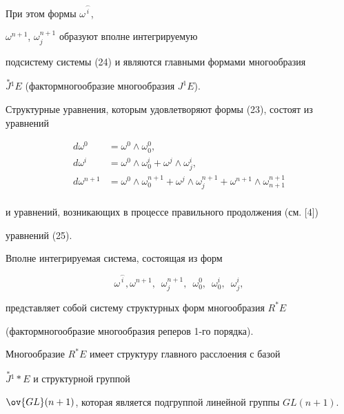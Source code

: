 При этом формы $\omega^{\overset{\frown}{i}{}}$,


$\omega^{n+1}$, $\omega_j^{n+1}$ образуют вполне интегрируемую 


подсистему системы (24) и являются главными формами многообразия


$\overset{*}{J}{}^1 E$ (фактормногообразие многообразия $J^1 E$).


Структурные уравнения, которым удовлетворяют формы (23), состоят из уравнений


\begin{equation}


\begin{split}


d\omega^0&=\omega^0 \wedge \omega_0^0, \\


d\omega^i&=\omega^0 \wedge \omega_0^i+\omega^j \wedge \omega_j^i, \\


d\omega^{n+1}&=\omega^0 \wedge \omega_0^{n+1}+\omega^j \wedge


\omega_j^{n+1}+\omega^{n+1} \wedge \omega_{n+1}^{n+1} \\


\end{split} 


\end{equation}


и уравнений, возникающих в процессе правильного продолжения (см. [4]) 


уравнений (25).





Вполне интегрируемая система, состоящая из форм


\begin{equation}


\omega^{\overset{\frown}{i}{}},


\omega^{n+1},\ \; \omega_j^{n+1},\ \; \omega_0^0,\ \; \omega_0^i,\ \; \omega_j^i,


\end{equation}


представляет собой систему структурных форм многообразия $R^ * E$


(фактормногообразие многообразия реперов 1-го порядка).


Многообразие $R^ * E$ имеет структуру главного расслоения с базой


$\overset{*}{J}{}^1* E$ и структурной группой


$\ov {GL} ({n+1})$, которая является подгруппой линейной группы $GL ({n+1})$.


